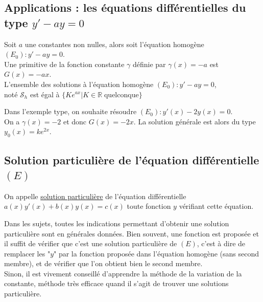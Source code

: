 \documentclass[french]{book}
\newcommand{\cals}{\mathscr{S}}
\begin{document}
\subsection{Applications : les équations différentielles du type $y'-ay=0$ }

Soit $a$ une constantes non nulles, alors soit l'équation homogène $(E_0): y'-ay=0 $. \\

Une primitive de la fonction constante $\gamma$ définie par $\gamma(x)=-a$ est $G(x)=-ax$. \\

L'ensemble des solutions à l'équation homogène $(E_0): y'-ay=0 $,\\
 noté $\cals_h$ est égal à $\{Ke^{ax} \vert  K\in \mathbb{R} \; \text{quelconque} \}$



\begin{exemple}
Dans l'exemple type, on souhaite résoudre $(E_0):y'(x)-2y(x)=0$. \\
On a $\gamma(x)=-2$ et donc $G(x)=-2x$. La solution générale est alors du type $y_0(x)=ke^{2x}$.
\end{exemple}




\subsection{Solution particulière de l'équation différentielle $(E)$}%

\begin{defn}
On appelle \underline{solution particulière} de l'équation différentielle $a(x)y'(x)+b(x)y(x)= c(x)$ toute fonction $y$ vérifiant cette équation.
\end{defn}

Dans les sujets, toutes les indications permettant d'obtenir une solution particulière sont en générales données. Bien souvent, une fonction est proposée et il suffit de vérifier que c'est une solution particulière de $(E)$, c'est à dire de remplacer les "$y$" par la fonction proposée dans l'équation homogène (sans second membre), et de vérifier que l'on obtient bien le second membre.\\

Sinon, il est vivement conseillé d'apprendre la méthode de la variation de la constante, méthode très efficace quand il s'agit de trouver une solutions particulière.
\end{document}
